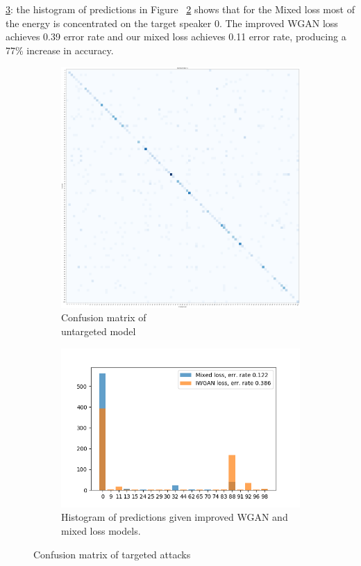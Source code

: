 \ref{fig:confusion_matrices}: the histogram of predictions in Figure
~\ref{fig:pred_comp_spk0} shows that for the Mixed loss most of the energy is
concentrated on the target speaker 0. The improved WGAN loss achieves 0.39 error
rate and our mixed loss achieves 0.11 error rate, producing a 77\%
increase in accuracy. 
\begin{figure}[t]
    \centering
    \begin{subfigure}[b]{0.3\textwidth}
        \includegraphics[width=\textwidth]{./fig/conf_mat_cnn_knn.png}
        \caption{Confusion matrix of \\untargeted model}
        \label{fig:conf_mat_cnn_knn}
    \end{subfigure}
    \quad
    \begin{subfigure}[b]{0.4\textwidth}
        \includegraphics[width=\textwidth]{./fig/pred_comparisson_spk0.png}
        \caption{Histogram of predictions given improved WGAN and mixed loss models.}
        \label{fig:pred_comp_spk0}
    \end{subfigure}
    \caption{Confusion matrix of targeted attacks}
    \label{fig:confusion_matrices}
\end{figure}

